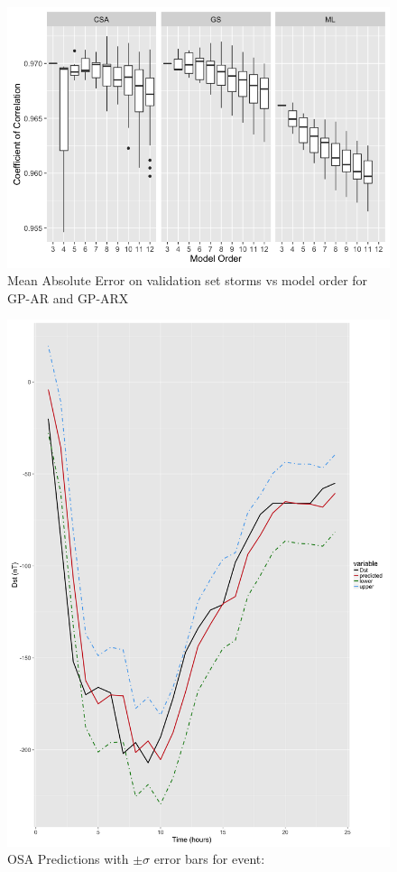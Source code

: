 \documentclass[sw, draft]{AGUTeX}
\begin{document}
\begin{figure}
\noindent\includegraphics[width=\textwidth]{Compare-cc-arx.png}
\caption{Mean Absolute Error on validation set storms vs model order for GP-AR and GP-ARX}
\label{fig:CompareCCARX}
\end{figure}


\begin{figure}
\noindent\includegraphics[width=\textwidth]{PredictionsModel1/PredErrBars_Storm5.png}
\caption{OSA Predictions with $\pm \sigma$ error bars for event: }
\label{fig:ComparePred1}
\end{figure}
\end{document}
